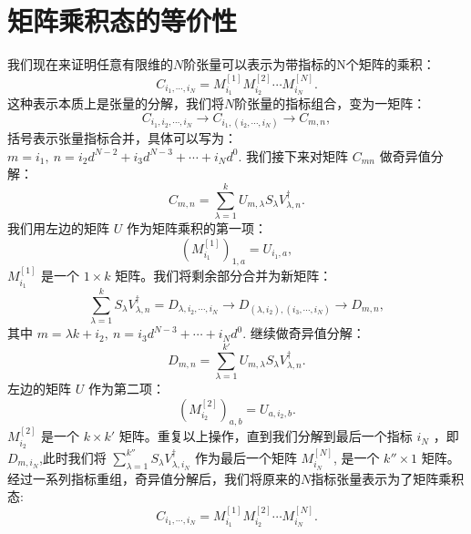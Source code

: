 \documentclass[UTF8]{ctexart}
\begin{document}
\section*{矩阵乘积态的等价性}
\noindent 我们现在来证明任意有限维的$N$阶张量可以表示为带指标的N个矩阵的乘积：
\begin{equation}
	C_{i_{1},\cdots,i_{N}}=M_{i_{1}}^{\left[1\right]}M_{i_{2}}^{\left[2\right]}\cdots M_{i_{N}}^{\left[N\right]} .
\end{equation}
这种表示本质上是张量的分解，我们将$N$阶张量的指标组合，变为一矩阵：
\begin{equation}
	C_{i_{1},i_{2},\cdots,i_{N}}\rightarrow C_{i_{1},\left(i_{2},\cdots,i_{N}\right)}\rightarrow C_{m,n},
\end{equation}
括号表示张量指标合并，具体可以写为： $m=i_{1},\ n=i_{2}d^{N-2}+i_{3}d^{N-3}+\cdots+i_{N}d^{0}$. 我们接下来对矩阵 $C_{mn}$ 做奇异值分解：
\begin{equation}
	C_{m,n}=\sum_{\lambda=1}^{k}U_{m,\lambda}S_{\lambda}V_{\lambda,n}^{\dagger} .
\end{equation}
我们用左边的矩阵 $U$ 作为矩阵乘积的第一项：
\begin{equation}
	\left(M_{i_{1}}^{\left[1\right]}\right)_{1,a}=U_{i_{1},a} ,
\end{equation}
$M_{i_{1}}^{\left[1\right]}$ 是一个 $1\times k$ 矩阵。我们将剩余部分合并为新矩阵：
\begin{equation}
	\sum_{\lambda=1}^{k}S_{\lambda}V_{\lambda,n}^{\dagger}=D_{\lambda,i_{2},\cdots,i_{N}}\rightarrow D_{\left(\lambda,i_{2}\right),\left(i_{3},\cdots,i_{N}\right)}\rightarrow D_{m,n} ,
\end{equation}
其中 $m=\lambda k+i_{2},\ n=i_{3}d^{N-3}+\cdots+i_{N}d^{0}$. 继续做奇异值分解：
\begin{equation}
	D_{m,n}=\sum_{\lambda=1}^{k'}U_{m,\lambda}S_{\lambda}V_{\lambda,n}^{\dagger}.
\end{equation}
左边的矩阵 $U$ 作为第二项：
\begin{equation}
	\left(M_{i_{2}}^{\left[2\right]}\right)_{a,b}=U_{a,i_{2},b}.
\end{equation}
$M_{i_{2}}^{\left[2\right]}$ 是一个 $k\times k'$ 矩阵。重复以上操作，直到我们分解到最后一个指标 $i_{N}$ ，即 $D_{m,i_{N}}$,此时我们将 $\sum_{\lambda=1}^{k''}S_{\lambda}V_{\lambda,i_{N}}^{\dagger}$ 作为最后一个矩阵 $M_{i_{N}}^{\left[N\right]}$, 是一个 $k'' \times 1$ 矩阵。
经过一系列指标重组，奇异值分解后，我们将原来的$N$指标张量表示为了矩阵乘积态:
\begin{equation}
	C_{i_{1},\cdots,i_{N}}=M_{i_{1}}^{\left[1\right]}M_{i_{2}}^{\left[2\right]}\cdots M_{i_{N}}^{\left[N\right]}.
\end{equation}
\end{document}
